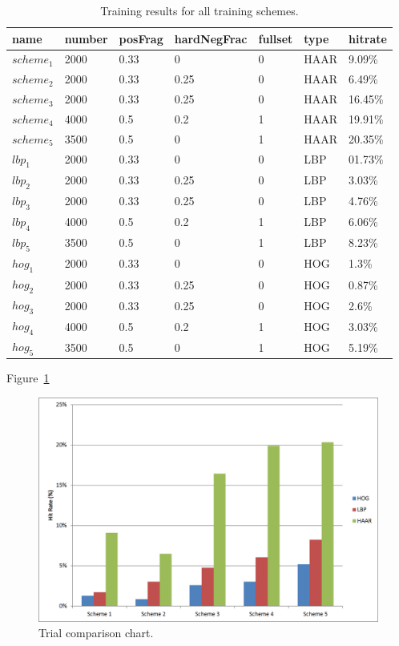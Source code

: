 \documentclass{llncs}
\begin{document}
{		\begin{table}[H]
			\centering
			\caption{Training results for all training schemes.}
			\label{tab:training_results}
			\begin{tabularx}{\textwidth}{XXXlXXX}
				\toprule
				\textbf{name} & \textbf{number} & \textbf{posFrag} & \textbf{hardNegFrac} & \textbf{fullset} & \textbf{type} & \textbf{hitrate} \\
				\midrule
					\(scheme_1\) & 2000 & 0.33 & 0 & 0 & HAAR & 9.09\% \\
					\(scheme_2\) & 2000 & 0.33 & 0.25 & 0 & HAAR & 6.49\% \\
					\(scheme_3\) & 2000 & 0.33 & 0.25 & 0 & HAAR & 16.45\% \\
					\(scheme_4\) & 4000 & 0.5 & 0.2 & 1 & HAAR & 19.91\% \\
					\(scheme_5\) & 3500 & 0.5 & 0 & 1 & HAAR & 20.35\% \\
					\(lbp_1\) & 2000 & 0.33 & 0 & 0 & LBP & 01.73\% \\
					\(lbp_2\) & 2000 & 0.33 & 0.25 & 0 & LBP & 3.03\% \\
					\(lbp_3\) & 2000 & 0.33 & 0.25 & 0 & LBP & 4.76\% \\
					\(lbp_4\) & 4000 & 0.5 & 0.2 & 1 & LBP & 6.06\% \\
					\(lbp_5\) & 3500 & 0.5 & 0 & 1 & LBP & 8.23\% \\
					\(hog_1\) & 2000 & 0.33 & 0 & 0 & HOG & 1.3\% \\
					\(hog_2\) & 2000 & 0.33 & 0.25 & 0 & HOG & 0.87\% \\
					\(hog_3\) & 2000 & 0.33 & 0.25 & 0 & HOG & 2.6\% \\
					\(hog_4\) & 4000 & 0.5 & 0.2 & 1 & HOG & 3.03\% \\
					\(hog_5\) & 3500 & 0.5 & 0 & 1 & HOG & 5.19\% \\
				\bottomrule
			\end{tabularx}
		\end{table}

		Figure~\ref{fig:trial_comparison_chart}

		\begin{figure}[H]
			\includegraphics[width=\textwidth]{images/results/comparison_chart}
			\caption{Trial comparison chart.}
			\label{fig:trial_comparison_chart}
		\end{figure}

	}
\end{document}
